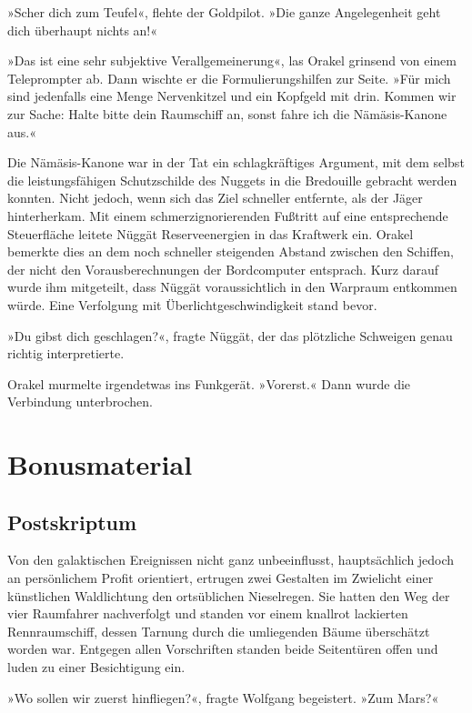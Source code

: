 »Scher dich zum Teufel«, flehte der Goldpilot. »Die ganze Angelegenheit geht dich überhaupt nichts an!«

»Das ist eine sehr subjektive Verallgemeinerung«, las Orakel grinsend von einem Teleprompter ab. Dann wischte er die Formulierungshilfen zur Seite. »Für mich sind jedenfalls eine Menge Nervenkitzel und ein Kopfgeld mit drin. Kommen wir zur Sache: Halte bitte dein Raumschiff an, sonst fahre ich die Nämäsis-Kanone aus.«

Die Nämäsis-Kanone war in der Tat ein schlagkräftiges Argument, mit dem selbst die leistungsfähigen Schutzschilde des Nuggets in die Bredouille gebracht werden konnten. Nicht jedoch, wenn sich das Ziel schneller entfernte, als der Jäger hinterherkam. Mit einem schmerzignorierenden Fußtritt auf eine entsprechende Steuerfläche leitete Nüggät Reserveenergien in das Kraftwerk ein. Orakel bemerkte dies an dem noch schneller steigenden Abstand zwischen den Schiffen, der nicht den Vorausberechnungen der Bordcomputer entsprach. Kurz darauf wurde ihm mitgeteilt, dass Nüggät voraussichtlich in den Warpraum entkommen würde. Eine Verfolgung mit Überlichtgeschwindigkeit stand bevor.

»Du gibst dich geschlagen?«, fragte Nüggät, der das plötzliche Schweigen genau richtig interpretierte.

Orakel murmelte irgendetwas ins Funkgerät. »Vorerst.« Dann wurde die Verbindung unterbrochen.



\part{Bonusmaterial}

\chapter{Postskriptum}

Von den galaktischen Ereignissen nicht ganz unbeeinflusst, hauptsächlich jedoch an persönlichem Profit orientiert, ertrugen zwei Gestalten im Zwielicht einer künstlichen Waldlichtung den ortsüblichen Nieselregen. Sie hatten den Weg der vier Raumfahrer nachverfolgt und standen vor einem knallrot lackierten Rennraumschiff, dessen Tarnung durch die umliegenden Bäume überschätzt worden war. Entgegen allen Vorschriften standen beide Seitentüren offen und luden zu einer Besichtigung ein.

»Wo sollen wir zuerst hinfliegen?«, fragte Wolfgang begeistert. »Zum Mars?«

